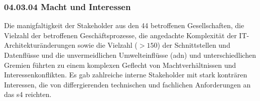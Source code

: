 \subsubsection*{04.03.04 Macht und Interessen}
{}
\label{sec:04.03.04_MachtUndInteressen}


\par Die manigfaltigkeit der Stakeholder aus den 44 betroffenen Gesellschaften, die Vielzahl der betroffenen Geschäftsprozesse, die angedachte Komplexität der IT$‑$Architekturänderungen sowie die Vielzahl ($>150$) der Schnittstellen und Datenflüsse und die unvermeidlichen Umwelteinflüsse (\gls{adn}) und unterschiedlichen Gremien führten zu einem komplexen Geflecht von Machtverhältnissen und Interessenkonflikten. Es gab zahlreiche interne Stakeholder mit stark konträren Interessen, die von differgierenden technischen und fachlichen Anforderungen an das \gls{s4} reichten. 
